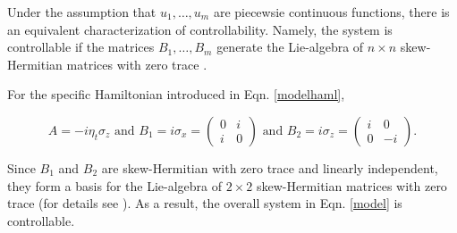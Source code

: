 \documentclass[{../RL_for_QSP.tex}]{subfiles}
\begin{document}
Under the assumption that $u_1, \hdots, u_m$ are piecewsie continuous functions, there is an equivalent characterization of controllability. Namely, the system is controllable if the matrices $B_1, \hdots, B_m$ generate the Lie-algebra of $n \times n$ skew-Hermitian matrices with zero trace \cite{d2007introduction}. 

For the specific Hamiltonian introduced in Eqn. \ref{modelhaml}, 

$$A = -i \eta_t \sigma_z \text{ and } B_1 = i \sigma_x = \begin{pmatrix} 0 & i \\ i & 0\end{pmatrix} \text{ and } B_2 = i \sigma_z = \begin{pmatrix} i & 0 \\ 0 & -i\end{pmatrix}.$$

Since $B_1$ and $B_2$ are skew-Hermitian with zero trace and linearly independent, they form a basis for the Lie-algebra of $2 \times 2$ skew-Hermitian matrices with zero trace (for details see \cite{aless2010topo}). As a result, the overall system in Eqn. \ref{model} is controllable.



\end{document}
